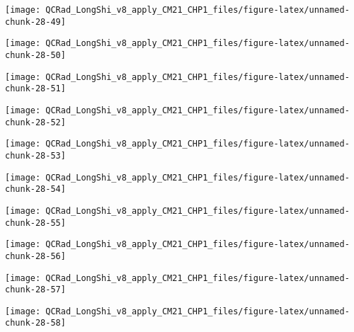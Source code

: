 \documentclass[
  10pt,
  a4paper,oneside]{article}
\begin{document}
\begin{center}\texttt{[image: QCRad\_LongShi\_v8\_apply\_CM21\_CHP1\_files/figure-latex/unnamed-chunk-28-49]} \end{center}

\begin{center}\texttt{[image: QCRad\_LongShi\_v8\_apply\_CM21\_CHP1\_files/figure-latex/unnamed-chunk-28-50]} \end{center}

\begin{center}\texttt{[image: QCRad\_LongShi\_v8\_apply\_CM21\_CHP1\_files/figure-latex/unnamed-chunk-28-51]} \end{center}

\begin{center}\texttt{[image: QCRad\_LongShi\_v8\_apply\_CM21\_CHP1\_files/figure-latex/unnamed-chunk-28-52]} \end{center}

\begin{center}\texttt{[image: QCRad\_LongShi\_v8\_apply\_CM21\_CHP1\_files/figure-latex/unnamed-chunk-28-53]} \end{center}

\begin{center}\texttt{[image: QCRad\_LongShi\_v8\_apply\_CM21\_CHP1\_files/figure-latex/unnamed-chunk-28-54]} \end{center}

\begin{center}\texttt{[image: QCRad\_LongShi\_v8\_apply\_CM21\_CHP1\_files/figure-latex/unnamed-chunk-28-55]} \end{center}

\begin{center}\texttt{[image: QCRad\_LongShi\_v8\_apply\_CM21\_CHP1\_files/figure-latex/unnamed-chunk-28-56]} \end{center}

\begin{center}\texttt{[image: QCRad\_LongShi\_v8\_apply\_CM21\_CHP1\_files/figure-latex/unnamed-chunk-28-57]} \end{center}

\begin{center}\texttt{[image: QCRad\_LongShi\_v8\_apply\_CM21\_CHP1\_files/figure-latex/unnamed-chunk-28-58]} \end{center}
\end{document}
